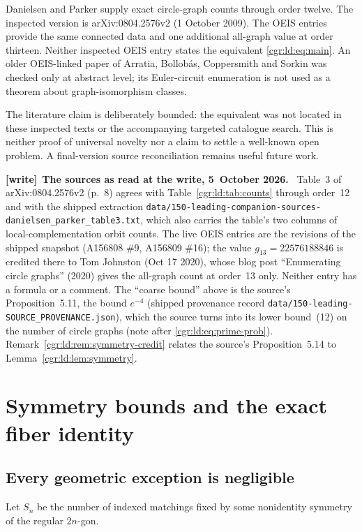 \documentclass[11pt,letterpaper]{article}
\numberwithin{equation}{section}
\theoremstyle{definition}\newtheorem{definition}[theorem]{Definition}
\theoremstyle{remark}\newtheorem{remark}[theorem]{Remark}
\newcommand{\file}[1]{\nolinkurl{#1}}
\newenvironment{writenote}[1][]{\par\smallskip\begingroup\small
 \noindent\textbf{[write]}\if\relax\detokenize{#1}\relax\else~\textbf{#1.}\fi\ }%
 {\par\endgroup\smallskip}
\begin{document}
Danielsen and Parker \cite[Section 3, Table 3]{DP09} supply exact
circle-graph counts through order twelve. The inspected version is
arXiv:0804.2576v2 (1 October 2009). The OEIS entries
\cite{OEISc,OEISg} provide the same connected data and one additional
all-graph value at order thirteen. Neither inspected OEIS entry
states the equivalent \eqref{cgr:ld:eq:main}. An older OEIS-linked paper
of Arratia, Bollob\'as, Coppersmith and Sorkin was checked only at
abstract level; its Euler-circuit enumeration is not used as a
theorem about graph-isomorphism classes.

The literature claim is deliberately bounded: the equivalent was
not located in these inspected texts or the accompanying targeted
catalogue search. This is neither proof of universal novelty nor a
claim to settle a well-known open problem. A final-version source
reconciliation remains useful future work.
\begin{writenote}[The sources as read at the write, 5~October 2026]
Table~3 of arXiv:0804.2576v2 (p.~8) agrees with Table~\ref{cgr:ld:tab:counts} through order~12 and with the shipped extraction \file{data/150-leading-companion-sources-danielsen_parker_table3.txt}, which also carries the table's two columns of local-complementation orbit counts. The live OEIS entries are the revisions of the shipped snapshot (A156808 \#9, A156809 \#16); the value $g_{13}=22576188846$ is credited there to Tom Johnston (Oct 17 2020), whose blog post ``Enumerating circle graphs'' (2020) gives the all-graph count at order~13 only. Neither entry has a formula or a comment. The ``coarse bound'' above is the source's Proposition~5.11, the bound $e^{-4}$ (shipped provenance record \file{data/150-leading-SOURCE_PROVENANCE.json}), which the source turns into its lower bound~(12) on the number of circle graphs (note after \eqref{cgr:ld:eq:prime-prob}). Remark~\ref{cgr:ld:rem:symmetry-credit} relates the source's Proposition~5.14 to Lemma~\ref{cgr:ld:lem:symmetry}.
\end{writenote}

\section{Symmetry bounds and the exact fiber identity}\label{cgr:ld:sec:symmetry}
\subsection{Every geometric exception is negligible}
Let $S_n$ be the number of indexed matchings fixed by some
nonidentity symmetry of the regular $2n$-gon.
\end{document}
